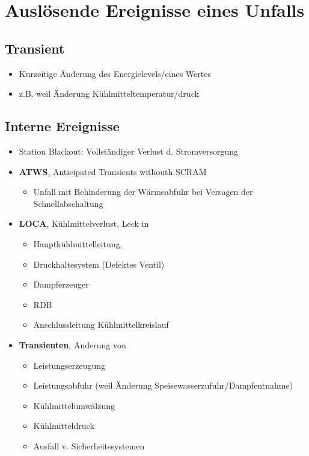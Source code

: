 \documentclass[12pt]{article}
\begin{document}
\section{Auslösende Ereignisse eines Unfalls}

\subsection{Transient}
\begin{itemize}
  \item Kurzeitige Änderung des Energielevels/eines Wertes
  \item z.B. weil Änderung Kühlmitteltemperatur/druck
\end{itemize}

\subsection{Interne Ereignisse}
\begin{itemize}
  \item Station Blackout: Vollständiger Verlust d. Stromversorgung
  \item \textbf{ATWS}, Anticipated Transients withouth SCRAM
  \begin{itemize}
    \item Unfall mit Behinderung der Wärmeabfuhr bei Versagen der Schnellabschaltung
  \end{itemize}
  \item \textbf{LOCA}, Kühlmittelverlust, Leck in
  \begin{itemize}
    \item Hauptkühlmittelleitung,
    \item Druckhaltesystem (Defektes Ventil)
    \item Dampferzeuger
    \item RDB
    \item Anschlussleitung Kühlmittelkreislauf
  \end{itemize}
  \item \textbf{Transienten}, Änderung von
  \begin{itemize}
    \item Leistungserzeugung
    \item Leistungsabfuhr (weil Änderung Speisewasserzufuhr/Dampfentnahme)
    \item Kühlmittelumwälzung
    \item Kühlmitteldruck
    \item Ausfall v. Sicherheitssystemen
  \end{itemize}
\end{itemize}
\end{document}
